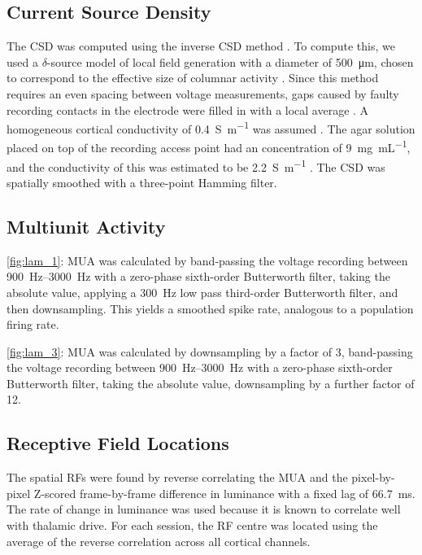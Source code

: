 \subsection{Current Source Density}

The \ac{CSD} was computed using the inverse \ac{CSD} method \citep{Pettersen2006}.
To compute this, we used a $\delta$-source model of local field generation with a diameter of \SI{500}{\micro\metre}, chosen to correspond to the effective size of columnar activity \citep{Horton2005,Lund2003}.
Since this method requires an even spacing between voltage measurements, gaps caused by faulty recording contacts in the electrode were filled in with a local average \citep{Wojcik2010}.
A homogeneous cortical conductivity of \SI{0.4}{\siemens\per\metre} was assumed \citep{Logothetis2007}.
The agar solution placed on top of the recording access point had an  concentration of \SI{9}{\mg\per\mL}, and the conductivity of this was estimated to be \SI{2.2}{\siemens\per\metre} \citep{Kandadai2012}.
The \ac{CSD} was spatially smoothed with a three-point Hamming filter.


\subsection{Multiunit Activity}

\autoref{fig:lam_1}: \ac{MUA} was calculated by band-passing the voltage recording between \SIrange{900}{3000}{Hz} with a zero-phase sixth-order Butterworth filter, taking the absolute value, applying a \SI{300}{Hz} low pass third-order Butterworth filter, and then downsampling.
This yields a smoothed spike rate, analogous to a population firing rate.

\autoref{fig:lam_3}: \ac{MUA} was calculated by downsampling by a factor of 3, band-passing the voltage recording between \SIrange{900}{3000}{Hz} with a zero-phase sixth-order Butterworth filter, taking the absolute value, downsampling by a further factor of 12.


\subsection{Receptive Field Locations}

The spatial \acp{RF} were found by reverse correlating the \ac{MUA} and the pixel-by-pixel Z-scored frame-by-frame difference in luminance with a fixed lag of \SI{66.7}{\milli\second}.
The rate of change in luminance was used because it is known to correlate well with thalamic drive.
For each session, the \ac{RF} centre was located using the average of the reverse correlation across all cortical channels.


